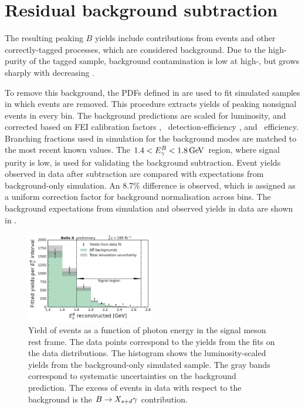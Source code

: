 \section{Residual \B background subtraction} \label{sec:post_fit}

The resulting peaking $B$ yields include contributions from \BtoXsgamma events and other correctly-tagged \BB processes, which are considered background. Due to the high-purity of the tagged sample, background contamination is low at high-\EB, but grows sharply with decreasing \EB. 

To remove this background, the PDFs defined in  are used to fit simulated \BB samples in which \BtoXsgamma events are removed. This procedure extracts yields of peaking nonsignal events in every \EB bin. The background predictions are scaled for luminosity, and corrected based on FEI calibration factors \cite{Belle-II:2020fst}, \g~detection-efficiency \cite{gamma_eff}, and \piz~efficiency. Branching fractions used in simulation for the background modes are matched to the most recent known values. The \mbox{$1.4<{E^B_{\gamma}}<1.8\mathrm{\,Ge\kern -0.1em V}$} region, where signal purity is low, is used for validating the background subtraction. Event yields observed in data after subtraction are compared with expectations from background-only simulation. An 8.7\% difference is observed, which is assigned as a uniform correction factor for background normalisation across bins. The background expectations from simulation and observed yields in data are shown in .
 
 \begin{figure}[htbp!]
     \centering
     \includegraphics[width=0.5\textwidth]{results/plots/background_vs_data.pdf}
     \caption{Yield of \BB events as a function of photon energy in the signal \B meson rest frame. The data points correspond to the yields from the fits on the data \Mbc distributions. The histogram shows the luminosity-scaled yields from the background-only simulated sample. The gray bands correspond to systematic uncertainties on the \BB background prediction. The excess of events in data with respect to the \BB background is the $B\rightarrow X_{s+d}\gamma$ contribution. }
     \label{fig:background_vs_data}
 \end{figure}

